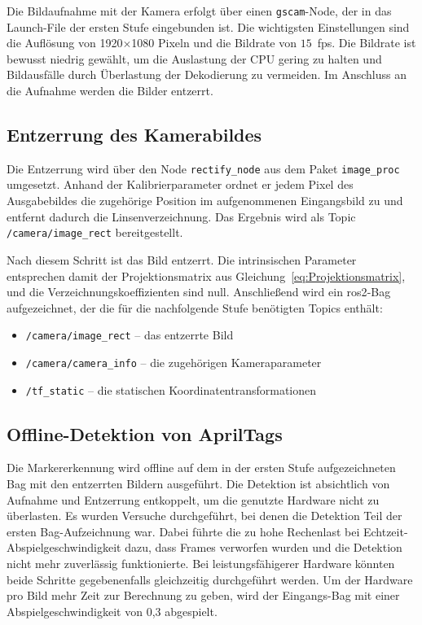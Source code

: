 Die Bildaufnahme mit der Kamera erfolgt über einen \texttt{gscam}-Node, der in das Launch-File der ersten Stufe eingebunden ist.
Die wichtigsten Einstellungen sind die Auflösung von 1920$\times$1080 Pixeln und die Bildrate von $15$~\gls{fps}.
Die Bildrate ist bewusst niedrig gewählt, um die Auslastung der CPU gering zu halten und Bildausfälle durch Überlastung der Dekodierung zu vermeiden.
Im Anschluss an die Aufnahme werden die Bilder entzerrt.

\subsection{Entzerrung des Kamerabildes}
\label{sec:kartierung_entzerrung}
Die Entzerrung wird über den Node \texttt{rectify\_node} aus dem Paket \texttt{image\_proc} umgesetzt.
Anhand der Kalibrierparameter ordnet er jedem Pixel des Ausgabebildes die zugehörige Position im aufgenommenen 
Eingangsbild zu und entfernt dadurch die Linsenverzeichnung.
Das Ergebnis wird als Topic \texttt{/camera/image\_rect} bereitgestellt.

Nach diesem Schritt ist das Bild entzerrt.
Die intrinsischen Parameter entsprechen damit der Projektionsmatrix aus Gleichung~\ref{eq:Projektionsmatrix}, und die Verzeichnungskoeffizienten sind null.
Anschließend wird ein \gls{ros2}-Bag aufgezeichnet, der die für die nachfolgende Stufe
benötigten Topics enthält:
\begin{itemize}
    \item \texttt{/camera/image\_rect} -- das entzerrte Bild
    \item \texttt{/camera/camera\_info} -- die zugehörigen Kameraparameter
    \item \texttt{/tf\_static} -- die statischen Koordinatentransformationen
\end{itemize}


\subsection{Offline-Detektion von AprilTags}
\label{sec:offline_detektion_apriltags}
Die Markererkennung wird offline auf dem in der ersten Stufe aufgezeichneten Bag mit den entzerrten Bildern ausgeführt.
Die Detektion ist absichtlich von Aufnahme und Entzerrung entkoppelt, um die genutzte Hardware nicht zu überlasten.
Es wurden Versuche durchgeführt, bei denen die Detektion Teil der ersten Bag-Aufzeichnung war.
Dabei führte die zu hohe Rechenlast bei Echtzeit-Abspielgeschwindigkeit dazu, dass Frames verworfen wurden und die Detektion nicht mehr zuverlässig funktionierte.
Bei leistungsfähigerer Hardware könnten beide Schritte gegebenenfalls gleichzeitig durchgeführt werden.
Um der Hardware pro Bild mehr Zeit zur Berechnung zu geben, wird der Eingangs-Bag mit einer Abspielgeschwindigkeit von 0,3 abgespielt.
 

